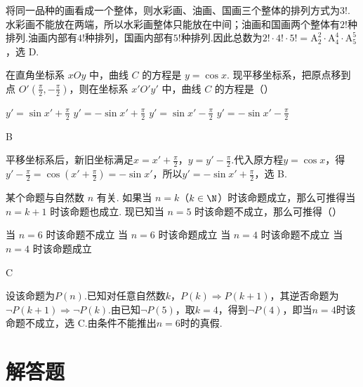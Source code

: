 \documentclass[UTF8,a4paper,oneside,11pt]{ctexbook}
\begin{document}
\begin{solution}
将同一品种的画看成一个整体，则水彩画、油画、国画三个整体的排列方式为\(3!\).水彩画不能放在两端，所以水彩画整体只能放在中间；油画和国画两个整体有\(2!\)种排列.油画内部有\(4!\)种排列，国画内部有\(5!\)种排列.因此总数为\(2!\cdot4!\cdot5!=\mathrm A_2^2\cdot\mathrm A_4^4\cdot\mathrm A_5^5\)，选 D.
\end{solution}

\begin{problem}
在直角坐标系 \(xOy\) 中，曲线 \(C\) 的方程是 \(y = \cos x\). 现平移坐标系，把原点移到点 \(O'\left(\frac{\pi}{2}, -\frac{\pi}{2}\right)\)，则在坐标系 \(x'O'y'\) 中，曲线 \(C\) 的方程是（\quad）

\choices
    {\(y' = \sin x' + \frac{\pi}{2} \)}
    {\(y' = -\sin x' + \frac{\pi}{2} \)}
    {\(y' = \sin x' - \frac{\pi}{2} \)}
    {\(y' = -\sin x' - \frac{\pi}{2} \)}
\end{problem}

\begin{answer}
B
\end{answer}

\begin{solution}
平移坐标系后，新旧坐标满足\(x=x'+\frac{\pi}{2}\)，\(y=y'-\frac{\pi}{2}\).代入原方程\(y=\cos x\)，得\(y'-\frac{\pi}{2}=\cos\left(x'+\frac{\pi}{2}\right)=-\sin x'\)，所以\(y'=-\sin x'+\frac{\pi}{2}\)，选 B.
\end{solution}

\begin{problem}
某个命题与自然数 \(n\) 有关. 如果当 \(n = k\)（\(k \in \N\)）时该命题成立，那么可推得当 \(n = k + 1\) 时该命题也成立. 现已知当 \(n = 5\) 时该命题不成立，那么可推得（\quad）

\choices
    {当 \(n = 6\) 时该命题不成立}
    {当 \(n = 6\) 时该命题成立}
    {当 \(n = 4\) 时该命题不成立}
    {当 \(n = 4\) 时该命题成立}
\end{problem}

\begin{answer}
C
\end{answer}

\begin{solution}
设该命题为\(P(n)\).已知对任意自然数\(k\)，\(P(k)\Rightarrow P(k+1)\)，其逆否命题为\(\neg P(k+1)\Rightarrow\neg P(k)\).由已知\(\neg P(5)\)，取\(k=4\)，得到\(\neg P(4)\)，即当\(n=4\)时该命题不成立，选 C.由条件不能推出\(n=6\)时的真假.
\end{solution}

\section{解答题}
\end{document}
